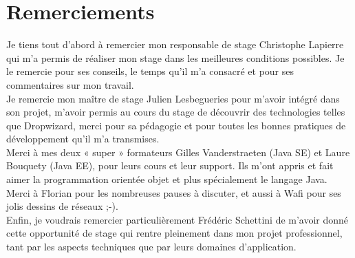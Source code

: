 \chapter*{Remerciements}


Je tiens tout d’abord à remercier mon responsable de stage Christophe Lapierre qui m’a permis de réaliser mon stage dans les meilleures conditions possibles. 
Je le remercie pour ses conseils, le temps qu’il m’a consacré et pour ses commentaires sur mon travail. \\

Je remercie mon maître de stage Julien Lesbegueries pour m'avoir intégré dans son projet, m'avoir permis au cours du stage de découvrir des technologies telles que Dropwizard, merci pour sa pédagogie et pour toutes les bonnes pratiques de développement qu'il m'a transmises.\\

Merci à mes deux « super » formateurs Gilles Vanderstraeten (Java SE) et Laure Bouquety (Java EE), pour leurs cours et leur support. Ils m'ont appris et fait aimer la programmation orientée objet et plus spécialement le langage Java. \\

Merci à Florian pour les nombreuses pauses à discuter, et aussi à Wafi pour ses jolis dessins de réseaux ;-).\\

Enfin, je voudrais remercier particulièrement Frédéric Schettini de m’avoir donné cette opportunité de stage qui rentre pleinement dans mon projet professionnel, tant par les aspects techniques que par leurs domaines d'application. \\

